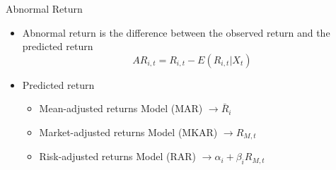 \documentclass{beamer}
\begin{document}
\begin{frame}{Abnormal Return}
\begin{itemize}
\item Abnormal return  is the difference between the observed return and the predicted return
\begin{equation*}
AR_{i,t} = R_{i,t} - E(R_{i,t}|X_t)
\end{equation*}
\item Predicted return
\begin{itemize}
\item Mean-adjusted returns Model (MAR) $ \longrightarrow \bar{R}_i $
\item Market-adjusted returns Model (MKAR) $ \longrightarrow {R}_{M,t} $
\item Risk-adjusted returns Model (RAR) $ \longrightarrow \alpha_i + \beta_i{R}_{M,t} $
\end{itemize}
\end{itemize}
\end{frame}
\end{document}
